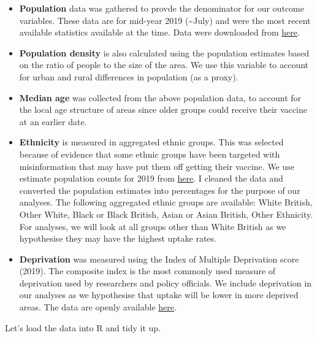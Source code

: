 \documentclass[
]{book}
\providecommand{\tightlist}{%
  \setlength{\itemsep}{0pt}\setlength{\parskip}{0pt}}
\begin{document}
\begin{itemize}
\tightlist
\item
  \textbf{Population} data was gathered to provde the denominator for our outcome variables. These data are for mid-year 2019 (\textasciitilde July) and were the most recent available statistics available at the time. Data were downloaded from \href{https://www.ons.gov.uk/peoplepopulationandcommunity/populationandmigration/populationestimates/datasets/populationestimatesforukenglandandwalesscotlandandnorthernireland}{here}.
\item
  \textbf{Population density} is also calculated using the population estimates based on the ratio of people to the size of the area. We use this variable to account for urban and rural differences in population (as a proxy).
\item
  \textbf{Median age} was collected from the above population data, to account for the local age structure of areas since older groups could receive their vaccine at an earlier date.
\item
  \textbf{Ethnicity} is measured in aggregated ethnic groups. This was selected because of evidence that some ethnic groups have been targeted with misinformation that may have put them off getting their vaccine. We use estimate population counts for 2019 from \href{https://www.ons.gov.uk/peoplepopulationandcommunity/populationandmigration/populationestimates/datasets/populationcharacteristicsresearchtables}{here}. I cleaned the data and converted the population estimates into percentages for the purpose of our analyses. The following aggregated ethnic groups are available: White British, Other White, Black or Black British, Asian or Asian British, Other Ethnicity. For analyses, we will look at all groups other than White British as we hypothesise they may have the highest uptake rates.
\item
  \textbf{Deprivation} was measured using the Index of Multiple Deprivation score (2019). The composite index is the most commonly used measure of deprivation used by researchers and policy officials. We include deprivation in our analyses as we hypothesise that uptake will be lower in more deprived areas. The data are openly available \href{https://www.gov.uk/government/statistics/english-indices-of-deprivation-2019}{here}.
\end{itemize}

Let's load the data into R and tidy it up.
\end{document}
